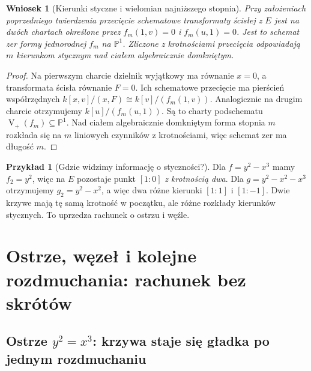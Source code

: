 \documentclass[11pt,a4paper,openany]{report}
\numberwithin{equation}{section}
\theoremstyle{plain}
\newtheorem{wniosek}[twierdzenie]{Wniosek}
\theoremstyle{definition}
\newtheorem{przyklad}[twierdzenie]{Przykład}
\theoremstyle{remark}
\newcommand{\PP}{\mathbb P}
\newcommand{\V}{\operatorname V}
\begin{document}
\begin{wniosek}[Kierunki styczne i wielomian najniższego stopnia]
\label{wn:ga5-tangent-directions}
Przy założeniach poprzedniego twierdzenia
przecięcie schematowe transformaty ścisłej z $E$
jest na dwóch chartach określone przez
$f_m(1,v)=0$ i $f_m(u,1)=0$. Jest to schemat zer
formy jednorodnej $f_m$ na $\PP^1$.
Zliczone z krotnościami przecięcia odpowiadają
$m$ kierunkom stycznym nad ciałem algebraicznie
domkniętym.
\end{wniosek}
\begin{proof}
Na pierwszym charcie dzielnik wyjątkowy ma równanie
$x=0$, a transformata ścisła równanie $F=0$.
Ich schematowe przecięcie ma pierścień współrzędnych
$k[x,v]/(x,F)\cong k[v]/(f_m(1,v))$.
Analogicznie na drugim charcie otrzymujemy
$k[u]/(f_m(u,1))$. Są to charty podschematu
$\V_+(f_m)\subseteq\PP^1$. Nad ciałem algebraicznie
domkniętym forma stopnia $m$ rozkłada się na
$m$ liniowych czynników z krotnościami, więc
schemat zer ma długość $m$.
\end{proof}

\begin{przyklad}[Gdzie widzimy informację o styczności?]
Dla $f=y^2-x^3$ mamy $f_2=y^2$, więc na $E$
pozostaje punkt $[1:0]$ \emph{z krotnością dwa}.
Dla $g=y^2-x^2-x^3$ otrzymujemy
$g_2=y^2-x^2$, a więc dwa różne kierunki
$[1:1]$ i $[1:-1]$. Dwie krzywe mają tę samą
krotność w początku, ale różne rozkłady kierunków
stycznych. To uprzedza rachunek o ostrzu i węźle.
\end{przyklad}

\section{Ostrze, węzeł i kolejne rozdmuchania: rachunek bez skrótów}
\label{sec:ga5-cusp-node}

\subsection[Ostrze: wygładzenie po jednym rozdmuchaniu]{Ostrze $y^2=x^3$: krzywa staje się gładka po jednym rozdmuchaniu}
\end{document}
